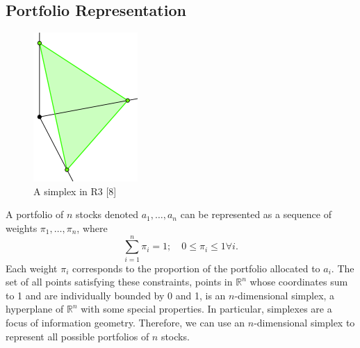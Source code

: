 \documentclass{article}
\begin{document}
\subsection{Portfolio Representation}
\begin{figure}
\includegraphics[scale=0.2]{simplex}
\caption{A simplex in R3 [8]}
\end{figure}
A portfolio of $n$ stocks denoted $a_1 , \dots , a_n$ can be represented as a sequence of weights $\pi_1, \dots , \pi_n$, where
\begin{equation}
\sum_{i=1}^n \pi_i =1; \quad 0 \leq \pi_i \leq 1 \forall i.
\end{equation}
Each weight $\pi_i$ corresponds to the proportion of the portfolio allocated to $a_i$. The set of all points satisfying these constraints, points in $\mathbb{R}^n$ whose coordinates sum to 1 and are individually bounded by 0 and 1, is an $n$-dimensional simplex, a hyperplane of $\mathbb{R}^n$ with some
special properties. In particular, simplexes are a focus of information geometry. Therefore, we can use an $n$-dimensional simplex to represent all possible portfolios of $n$ stocks.
\end{document}
